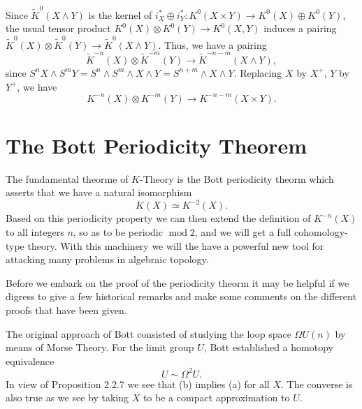 \documentclass[leqno]{book}
\numberwithin{equation}{section}
\theoremstyle{definition}
\begin{document}
            Since $\tilde{K}^{0}(X\wedge Y)$ is the kernel of $i^{*}_{X}\oplus i^{*}_{Y}:K^{0}(X\times Y)\to K^{0}(X)\oplus K^{0}(Y)$, the usual tensor product $K^{0}(X)\otimes K^{0}(Y)\to K^{0}(X,Y)$ induces a pairing $\tilde{K}^{0}(X)\otimes \tilde{K}^{0}(Y)\to \tilde{K}^{0}(X\wedge Y)$. Thus, we have a pairing
            \begin{equation*}
              \tilde{K}^{-n}(X)\otimes \tilde{K}^{-m}(Y)\to \tilde{K}^{-n-m}(X\wedge Y),
            \end{equation*} 
            since $S^{n}X\wedge S^{m}Y=S^{n}\wedge S^{m}\wedge X\wedge Y= S^{n+m}\wedge X\wedge Y$. Replacing $X$ by $X^{+}$, $Y$ by $Y^{+}$, we have
            \begin{equation*}
              K^{-n}(X)\otimes K^{-m}(Y)\to K^{-n-m}(X\times Y).
            \end{equation*}

        \section{The Bott Periodicity Theorem}

            The fundamental theorme of $K$-Theory is the Bott periodicity theorm which asserts that we have a natural isomorphism
            \begin{equation*}
              \tag{a}
              K(X)\simeq K^{-2}(X).
            \end{equation*}
            Based on this periodicity property we can then extend the definition of $K^{-n}(X)$ to all integers $n$, so as to be periodic $\operatorname{mod}2$, and we will get a full cohomology-type theory. With this machinery we will the have a powerful new tool for attacking many problems in algebraic topology.

            Before we embark on the proof of the periodicity theorm it may be helpful if we digress to give a few historical remarks and make some comments on the different proofs that have been given.

            The original approach of Bott \cite{Bott1} consisted of studying the loop space $\Omega U(n)$ by means of Morse Theory. For the limit group $U$, Bott established a homotopy equivalence
            \begin{equation*}
              \tag{b}
              U\sim \Omega^{2}U.
            \end{equation*}
            In view of Proposition 2.2.7 we see that (b) implies (a) for all $X$. The converse is also true as we see by taking $X$ to be a compact approximation to $U$.
\end{document}
